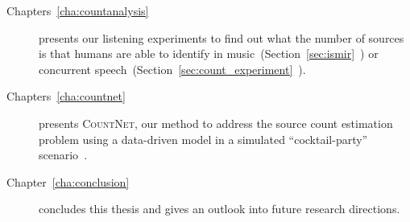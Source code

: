 \begin{description}
  \item[Chapters~\ref{cha:countanalysis}] presents our listening experiments to find out what the number of sources is that humans are able to identify in music~(Section~\ref{sec:ismir}~\cite{schoeffler13, stoeter13}) or concurrent speech~(Section~\ref{sec:count_experiment}~\cite{stoeter19, stoeter18}). 
  \item[Chapters~\ref{cha:countnet}] presents \textsc{CountNet}, our method to address the source count estimation problem using a data-driven model in a simulated ``cocktail-party'' scenario~\cite{stoeter19}.
  \item[Chapter~\ref{cha:conclusion}] concludes this thesis and gives an outlook into future research directions.
\end{description}

